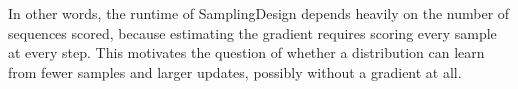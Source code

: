 In other words, the runtime of SamplingDesign depends heavily on the number of sequences scored, because estimating the gradient requires scoring every sample at every step. This motivates the question of whether a distribution can learn from fewer samples and larger updates, possibly without a gradient at all.
